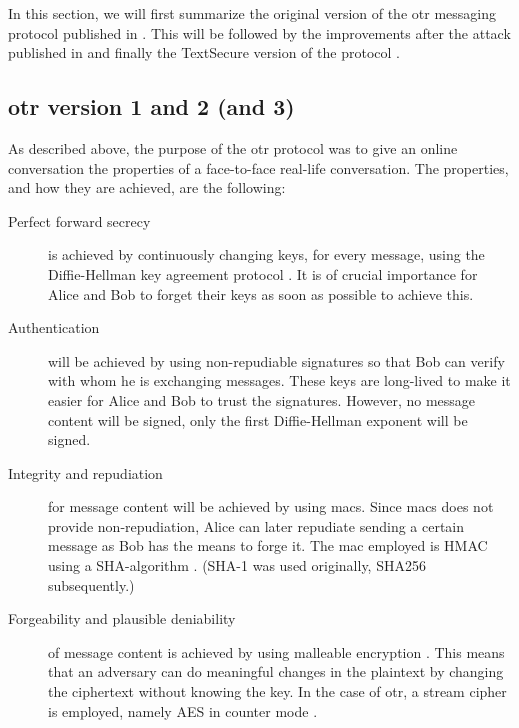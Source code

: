 \documentclass[draft]{llncs}
\begin{document}
In this section, we will first summarize the original version of the \ac{otr} 
messaging protocol published in \cite{otr2004}.
This will be followed by the improvements after the attack published in 
\cite{di2005secure} and finally the TextSecure version of the protocol 
\cite{frosch2014secure}.

\subsection{\acs{otr} version 1 and 2 (and 3)}

As described above, the purpose of the \ac{otr} protocol was to give an online 
conversation the properties of a face-to-face real-life conversation.
The properties, and how they are achieved, are the following:
\begin{description}
  \item[Perfect forward secrecy] is achieved by continuously changing keys, for 
    every message, using the Diffie-Hellman key agreement protocol \cite{dh}.
    It is of crucial importance for Alice and Bob to forget their keys as soon 
    as possible to achieve this.

  \item[Authentication] will be achieved by using non-repudiable signatures so 
    that Bob can verify with whom he is exchanging messages.
    These keys are long-lived to make it easier for Alice and Bob to trust the 
    signatures.
    However, no message content will be signed, only the first Diffie-Hellman 
    exponent will be signed.

  \item[Integrity and repudiation] for message content will be achieved by 
    using \acp{mac}.
    Since \acp{mac} does not provide non-repudiation, Alice can later repudiate 
    sending a certain message as Bob has the means to forge it.
    The \ac{mac} employed is HMAC \cite{hmac} using a SHA-algorithm \cite{shs}.
    (SHA-1 was used originally, SHA256 subsequently.)

  \item[Forgeability and plausible deniability] of message content is achieved 
    by using malleable encryption \cite{nonmalleable}.
    This means that an adversary can do meaningful changes in the plaintext by 
    changing the ciphertext without knowing the key.
    In the case of \ac{otr}, a stream cipher is employed, namely AES \cite{aes} 
    in counter mode \cite{blockmodes}.
\end{description}
\end{document}

